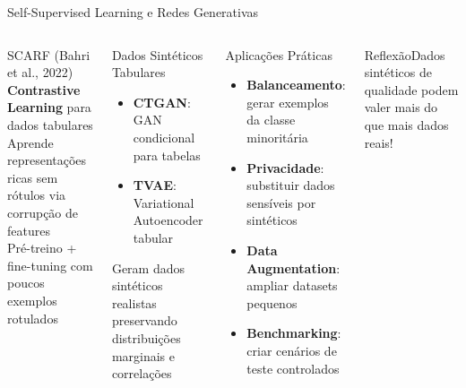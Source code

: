 \documentclass[aspectratio=169]{beamer}
\newcommand{\reflexao}[1]{\begin{alertblock}{Reflexão}#1\end{alertblock}}
\begin{document}
\begin{frame}[shrink=5]{Self-Supervised Learning e Redes Generativas}
    \begin{columns}
        \begin{block}{SCARF (Bahri et al., 2022)}
            \textbf{Contrastive Learning} para dados tabulares\\
            Aprende representações ricas sem rótulos via corrupção de features\\
            Pré-treino + fine-tuning com poucos exemplos rotulados
        \end{block}
        \begin{block}{Dados Sintéticos Tabulares}
            \begin{itemize}
                \item \textbf{CTGAN}: GAN condicional para tabelas
                \item \textbf{TVAE}: Variational Autoencoder tabular
            \end{itemize}
            Geram dados sintéticos realistas preservando distribuições marginais e correlações
        \end{block}
        \begin{block}{Aplicações Práticas}
            \begin{itemize}
                \item \textbf{Balanceamento}: gerar exemplos da classe minoritária
                \item \textbf{Privacidade}: substituir dados sensíveis por sintéticos
                \item \textbf{Data Augmentation}: ampliar datasets pequenos
                \item \textbf{Benchmarking}: criar cenários de teste controlados
            \end{itemize}
        \end{block}
        \reflexao{Dados sintéticos de qualidade podem valer mais do que mais dados reais!}
    \end{columns}
\end{frame}

\end{document}
